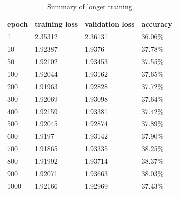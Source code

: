 \begin{table}[ht]
\centering
\begin{tabular}{|l|l|l|l|}
\hline
\textbf{epoch} & \textbf{training loss} & \textbf{validation loss} & \textbf{accuracy} \\ \hline
1              & 2.35312                & 2.36131                  & 36.06\%           \\ \hline
10             & 1.92387                & 1.9376                   & 37.78\%           \\ \hline
50             & 1.92102                & 1.93453                  & 37.55\%           \\ \hline
100            & 1.92044                & 1.93162                  & 37.65\%           \\ \hline
200            & 1.91963                & 1.92828                  & 37.72\%           \\ \hline
300            & 1.92069                & 1.93098                  & 37.64\%           \\ \hline
400            & 1.92159                & 1.93381                  & 37.42\%           \\ \hline
500            & 1.92045                & 1.92874                  & 37.89\%           \\ \hline
600            & 1.9197                 & 1.93142                  & 37.90\%           \\ \hline
700            & 1.91865                & 1.93335                  & 38.25\%           \\ \hline
800            & 1.91992                & 1.93714                  & 38.37\%           \\ \hline
900            & 1.92071                & 1.93663                  & 38.03\%           \\ \hline
1000           & 1.92166                & 1.92969                  & 37.43\%           \\ \hline
\end{tabular}
\caption{Summary of longer training}
\label{tab:summary_longer_training}
\end{table}

